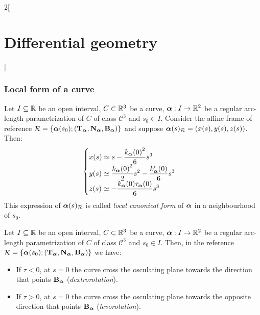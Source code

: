 \documentclass[../../../main_math.tex]{subfiles}
\begin{document}
\begin{multicols}{2}[\section{Differential geometry}]
  \subsubsection{Local form of a curve}
  \begin{definition}
    Let $I\subseteq\mathbb{R}$ be an open interval, $C\subset\mathbb{R}^3$ be a curve, $\boldsymbol{\mathrm{\alpha}}:I\rightarrow\mathbb{R}^2$ be a regular arc-length parametrization of $C$ of class $\mathcal{C}^3$ and $s_0\in I$. Consider the affine frame of reference $\mathcal{R}=\{\boldsymbol{\mathrm{\alpha}}(s_0);({\boldsymbol{\mathrm{T}}_{\boldsymbol{\mathrm{\alpha}}}},{\boldsymbol{\mathrm{N}}_{\boldsymbol{\mathrm{\alpha}}}},{\boldsymbol{\mathrm{B}}_{\boldsymbol{\mathrm{\alpha}}}})\}$ and suppose $\boldsymbol{\mathrm{\alpha}}(s)_{\mathcal{R}}=(x(s),y(s),z(s))$. Then:
    $$
      \begin{cases}
        \displaystyle x(s)\simeq s-\frac{{k_{\boldsymbol{\mathrm{\alpha}}}(0)}^2}{6}s^3                              \\
        \displaystyle y(s)\simeq \frac{{k_{\boldsymbol{\mathrm{\alpha}}}(0)}^2}{2}s^2-\frac{k_{\boldsymbol{\mathrm{\alpha}}}'(0)}{6}s^3 \\
        \displaystyle z(s)\simeq -\frac{k_{\boldsymbol{\mathrm{\alpha}}}(0){\tau_{\boldsymbol{\mathrm{\alpha}}}}(0)}{6}s^3
      \end{cases}
    $$
    This expression of $\boldsymbol{\mathrm{\alpha}}(s)_{\mathcal{R}}$ is called \emph{local canonical form} of $\boldsymbol{\mathrm{\alpha}}$ in a neighbourhood of $s_0$.
  \end{definition}
  \begin{corollary}
    Let $I\subseteq\mathbb{R}$ be an open interval, $C\subset\mathbb{R}^3$ be a curve, $\boldsymbol{\mathrm{\alpha}}:I\rightarrow\mathbb{R}^2$ be a regular arc-length parametrization of $C$ of class $\mathcal{C}^3$ and $s_0\in I$. Then, in the reference $\mathcal{R}=\{\boldsymbol{\mathrm{\alpha}}(s_0);({\boldsymbol{\mathrm{T}}_{\boldsymbol{\mathrm{\alpha}}}},{\boldsymbol{\mathrm{N}}_{\boldsymbol{\mathrm{\alpha}}}},{\boldsymbol{\mathrm{B}}_{\boldsymbol{\mathrm{\alpha}}}})\}$ we have:
    \begin{itemize}
      \item If $\tau <0$, at $s=0$ the curve cross the osculating plane towards the direction that points ${\boldsymbol{\mathrm{B}}_{\boldsymbol{\mathrm{\alpha}}}}$ (\emph{dextrorotation}).
      \item If $\tau >0$, at $s=0$ the curve cross the osculating plane towards the opposite direction that points ${\boldsymbol{\mathrm{B}}_{\boldsymbol{\mathrm{\alpha}}}}$ (\emph{levorotation}).
    \end{itemize}
  \end{corollary}

\end{multicols}
\end{document}
